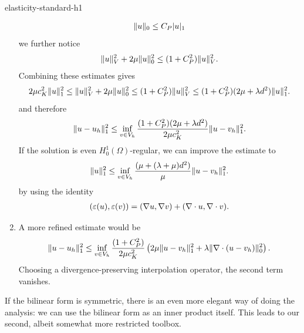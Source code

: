 \begin{Problem}{elasticity-standard-h1}
\begin{solution}
\begin{enumerate}
\begin{align}
    \lVert u\rVert_0\leq C_P |u|_1
   \end{align}
   we further notice
   \begin{align}
    \lVert u\rVert_V^2+2\mu\lVert u\rVert_0^2\leq (1+C_P^2) \lVert u\rVert_V^2.
   \end{align}
   Combining these estimates gives
   \begin{align}
   2\mu c_K^2\lVert u\rVert_1^2\leq
    \lVert u\rVert_V^2+2\mu \lVert u\rVert_0^2\leq
    (1+C_P^2)\lVert u\rVert_V^2\leq
    (1+C_P^2)(2\mu+\lambda d^2)\lVert u\rVert_1^2.
   \end{align}
   and therefore
   \begin{align}
    \lVert u-u_h\rVert_1^2\leq \inf_{v\in V_h} \frac{(1+C_P^2)(2\mu+\lambda d^2)}{2\mu c_K^2}\lVert u-v_h\rVert_1^2.
   \end{align}
   If the solution is even $H_0^1(\Omega)$-regular, we can improve the estimate to
   \begin{align}
    \lVert u\rVert_1^2\leq \inf_{v\in V_h}\frac{(\mu+(\lambda+\mu) d^2)}{\mu}\lVert u-v_h\rVert_1^2.
   \end{align}
   by using the identity
   \begin{align}
    (\varepsilon(u), \varepsilon(v)) = (\nabla u, \nabla v) + (\nabla \cdot u, \nabla \cdot v).
   \end{align}

   \item A more refined estimate would be
   \begin{align}
    \lVert u-u_h\rVert_1^2\leq \inf_{v\in V_h}\frac{(1+C_P^2)}{2\mu c_K^2}\left(2\mu\lVert u-v_h\rVert_1^2+\lambda \lVert\nabla\cdot (u-v_h)\rVert_0^2\right).
   \end{align}
   Choosing a divergence-preserving interpolation operator, the second term vanishes.
  \end{enumerate}
\end{solution}
\end{Problem}

If the bilinear form is symmetric, there is an even more elegant way of
doing the analysis: we can use the bilinear form as an inner product
itself. This leads to our second, albeit somewhat more restricted toolbox.

